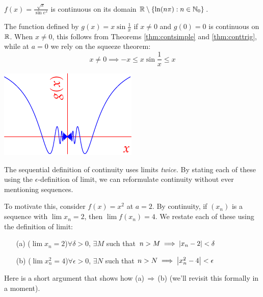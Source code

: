 \begin{examples}{}{}
\exstart $f(x)=\frac{\sqrt x}{\sin e^x}$ is continuous on its domain $\mathbb{R}\setminus\{\ln(n\pi):n\in\mathbb{N}_0\}$.
\begin{enumerate}\setcounter{enumi}{1}
	\begin{minipage}[t]{0.70\linewidth}\vspace{-5pt}
		\item The function defined by $g(x)=x\sin\frac 1x$ if $x\neq 0$ and $g(0)=0$ is continuous on $\mathbb{R}$. When $x\neq 0$, this follows from Theorems \ref{thm:contsimple} and \ref{thm:conttrig}, while at $a=0$ we rely on the squeeze theorem:
		\[x\neq 0\implies -x\le x\sin\frac 1x\le x\]
	\end{minipage}
	\hfill
	\begin{minipage}[t]{0.29\linewidth}\vspace{-5pt}
		\flushright\includegraphics{cont-ex1}
	\end{minipage}
\end{enumerate}
\end{examples}


\label{ex:easycont2}

The sequential definition of continuity uses limits \emph{twice.} By stating each of these using the $\epsilon$-definition of limit, we can reformulate continuity without ever mentioning sequences.\smallbreak

To motivate this, consider $f(x)=x^2$ at $a=2$. By continuity, if $(x_n)$ is a sequence with $\lim x_n=2$, then $\lim f(x_n)=4$. We restate each of these using the definition of limit:
	\begin{itemize}
	  \item[(a)] ($\lim x_n=2$)\quad $\forall\delta>0$, $\exists M$ such that $n>M\implies \left| x_n-2\right|<\delta$
	  \item[(b)] ($\lim x_n^2=4$)\quad $\forall\epsilon>0$, $\exists N$ such that $n>N\implies \left| x_n^2-4\right|<\epsilon$
	\end{itemize}
	Here is a short argument that shows how (a)\,$\Rightarrow$\,(b) (we'll revisit this formally in a moment).\medbreak
	 
